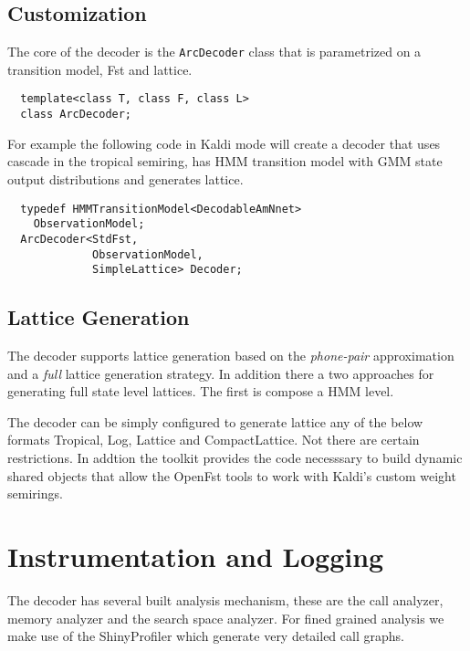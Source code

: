 \documentclass{article}
\begin{document}
\subsection{Customization}
\label{sec:custom}
The core of the decoder is the \texttt{ArcDecoder} class that is parametrized on a transition
model, Fst  and lattice.
\begin{verbatim}
  template<class T, class F, class L>
  class ArcDecoder;
\end{verbatim}

For example the following code in Kaldi mode will create a decoder that uses
cascade in the tropical semiring, has HMM transition model with GMM state 
output distributions and generates lattice.

\begin{verbatim}
  typedef HMMTransitionModel<DecodableAmNnet> 
    ObservationModel;
  ArcDecoder<StdFst,         
             ObservationModel,
             SimpleLattice> Decoder;
\end{verbatim}

\subsection{Lattice Generation}
The decoder supports lattice generation based on the \emph{phone-pair}
approximation and a \emph{full} lattice generation strategy. In addition 
there a two approaches for generating full state level lattices. The first
is compose a HMM level.

The decoder can be simply configured to generate lattice any of the below formats
Tropical, Log, Lattice and CompactLattice. Not there are certain restrictions.
In addtion the toolkit provides the code necesssary to build dynamic shared objects
that allow the OpenFst tools to work with Kaldi's custom weight semirings.



\section{Instrumentation and Logging}
\label{sec:instrumentation}
The decoder has several built analysis mechanism, these are the call analyzer,
memory analyzer and the search space analyzer. For fined grained analysis we 
make use of the ShinyProfiler which generate very detailed call graphs.
\end{document}
